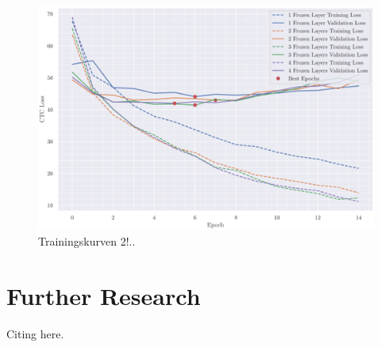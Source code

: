 \documentclass[12pt]{article}    %
\begin{document}
\begin{figure}[ht]
    \centering
    \includegraphics[width=\textwidth]{../4curves.pdf}
    \caption{Trainingskurven 2!..}
    \label{fig:3c}
\end{figure}

\section{Further Research}

Citing \cite{agarwal-zesch-2019-german} here.

\printbibliography
\end{document}
